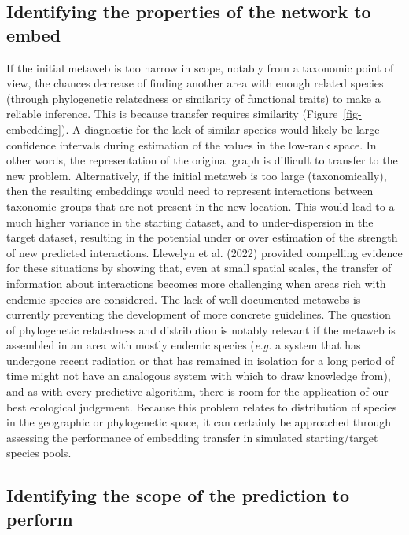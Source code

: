 \documentclass[
  letterpaper,
  DIV=11,
  numbers=noendperiod]{scrartcl}
\begin{document}
\hypertarget{identifying-the-properties-of-the-network-to-embed}{%
\subsection{Identifying the properties of the network to
embed}\label{identifying-the-properties-of-the-network-to-embed}}

If the initial metaweb is too narrow in scope, notably from a taxonomic
point of view, the chances decrease of finding another area with enough
related species (through phylogenetic relatedness or similarity of
functional traits) to make a reliable inference. This is because
transfer requires similarity (Figure~\ref{fig-embedding}). A diagnostic
for the lack of similar species would likely be large confidence
intervals during estimation of the values in the low-rank space. In
other words, the representation of the original graph is difficult to
transfer to the new problem. Alternatively, if the initial metaweb is
too large (taxonomically), then the resulting embeddings would need to
represent interactions between taxonomic groups that are not present in
the new location. This would lead to a much higher variance in the
starting dataset, and to under-dispersion in the target dataset,
resulting in the potential under or over estimation of the strength of
new predicted interactions. Llewelyn et al. (2022) provided compelling
evidence for these situations by showing that, even at small spatial
scales, the transfer of information about interactions becomes more
challenging when areas rich with endemic species are considered. The
lack of well documented metawebs is currently preventing the development
of more concrete guidelines. The question of phylogenetic relatedness
and distribution is notably relevant if the metaweb is assembled in an
area with mostly endemic species (\emph{e.g.} a system that has
undergone recent radiation or that has remained in isolation for a long
period of time might not have an analogous system with which to draw
knowledge from), and as with every predictive algorithm, there is room
for the application of our best ecological judgement. Because this
problem relates to distribution of species in the geographic or
phylogenetic space, it can certainly be approached through assessing the
performance of embedding transfer in simulated starting/target species
pools.

\hypertarget{identifying-the-scope-of-the-prediction-to-perform}{%
\subsection{Identifying the scope of the prediction to
perform}\label{identifying-the-scope-of-the-prediction-to-perform}}
\end{document}
